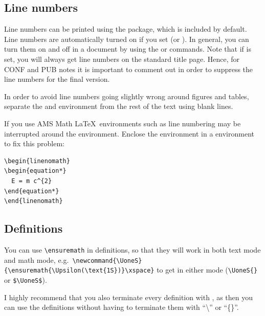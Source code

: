 \subsection{Line numbers}

Line numbers can be printed using the  package, 
which is included by default.
Line numbers are automatically turned on if you set  (or ).
In general, you can turn them on and off in a document by using the  or  commands.
Note that if  is set, you will always get line numbers on the standard title page.
Hence, for CONF and PUB notes it is important to comment out  in order to suppress the line numbers for the final version.

In order to avoid line numbers going slightly wrong around figures and tables,
separate the  and  environment from the rest of the text using blank lines.

If you use AMS Math \LaTeX\ environments such as  line numbering may be interrupted around the environment.
Enclose the environment in a  environment to fix this problem:
\begin{verbatim}
\begin{linenomath}
\begin{equation*}
  E = m c^{2}
\end{equation*}
\end{linenomath}
\end{verbatim}


\subsection{Definitions}

You can use \verb|\ensuremath| in definitions, so that they will work
in both text mode and math mode, e.g.\
\verb|\newcommand{\UoneS}{\ensuremath{\Upsilon(\text{1S})}\xspace}| to get
\UoneS in either mode (\verb|\UoneS{}| or \verb|$\UoneS$|).

I highly recommend that you also terminate every definition with ,
as then you can use the definitions without having to terminate them with
\enquote{\textbackslash\textvisiblespace} or \enquote{\{\}}.



